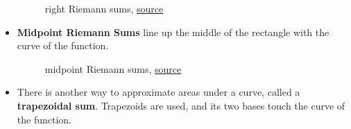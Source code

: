 \documentclass[12pt]{article}
\begin{document}
\begin{itemize}
\begin{figure}[H]
\begin{center}
                            \caption{right Riemann sums, \href{https://www.khanacademy.org/math/ap-calculus-bc/bc-integration-new/bc-6-2/a/riemann-sums-review?modal=1}{source}}
                        \end{center}
                    \end{figure}
                    \item \textbf{Midpoint Riemann Sums} line up the middle of the rectangle with the curve of the function.
                    \begin{figure}[H]
                        \begin{center}
                            \caption{midpoint Riemann sums, \href{https://www.khanacademy.org/math/ap-calculus-bc/bc-integration-new/bc-6-2/a/riemann-sums-review?modal=1}{source}}
                        \end{center}
                    \end{figure}
                    \item There is another way to approximate areas under a curve, called a \textbf{trapezoidal sum}. Trapezoids are used, and its two bases touch the curve of the function.
                    \begin{figure}[H]
                        \begin{center}

\end{center}
\end{figure}
\end{itemize}
\end{document}
